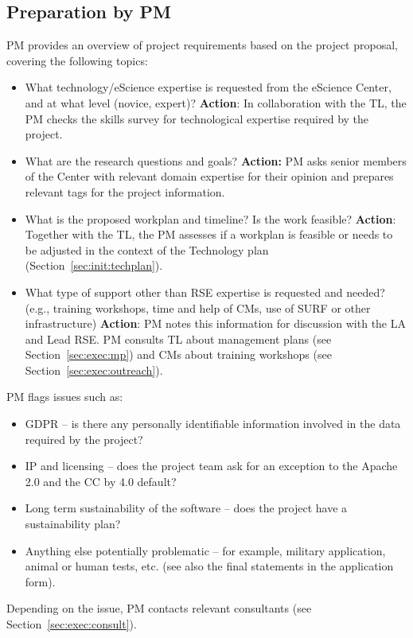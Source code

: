 \subsection{Preparation by PM}
PM provides an overview of project requirements based on the project proposal, covering the following topics:
\begin{itemize}
\item What technology/eScience expertise is requested from the eScience Center, and at what level (novice, expert)?
\textbf{Action}: In collaboration with the TL, the PM checks the skills survey for technological expertise required by the project.
\item What are the research questions and goals? \textbf{Action:} PM asks senior members of the Center with relevant domain
expertise for their opinion and prepares relevant tags for the project information.
\item What is the proposed workplan and timeline? Is the work feasible? \textbf{Action}: Together with the TL, the PM assesses
if a workplan is feasible or needs to be adjusted in the context of the Technology plan (Section~\ref{sec:init:techplan}).
\item What type of support other than RSE expertise is requested and needed? (e.g., training workshops, time and help of CMs,
use of SURF or other infrastructure) \textbf{Action}: PM notes this information for discussion with the LA and Lead
RSE. PM consults TL about management plans (see Section~\ref{sec:exec:mp}) and CMs about training workshops (see
Section~\ref{sec:exec:outreach}).
\end{itemize}
PM flags issues such as:
\begin{itemize}
\item GDPR – is there any personally identifiable information involved in the data required by the project? 
\item IP and licensing – does the project team ask for an exception to the Apache 2.0 and the CC by 4.0 default? 
\item Long term sustainability of the software – does the project have a sustainability plan? 
\item Anything else potentially problematic – for example, military application, animal or human tests, etc. (see also the
final statements in the application form).
\end{itemize}

Depending on the issue, PM contacts relevant consultants (see Section~\ref{sec:exec:consult}).

